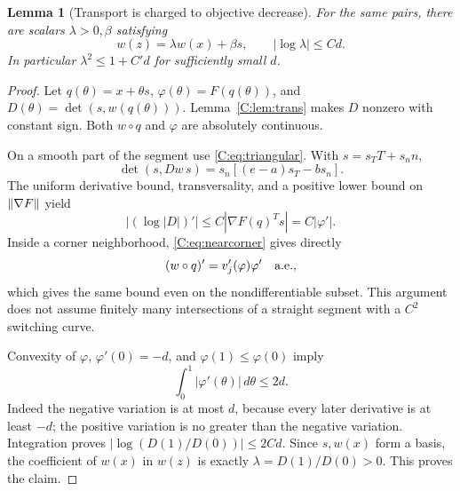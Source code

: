\documentclass[10pt,oneside,openany]{book}
\newtheorem{lemma}{Lemma}[chapter]
\theoremstyle{remark}\newtheorem{remark}{Remark}[chapter]
\begin{document}
\begin{lemma}[Transport is charged to objective decrease]\label{C:lem:transport}
For the same pairs, there are scalars $\lambda>0,\beta$ satisfying
\begin{equation}\label{C:eq:transport}
 w(z)=\lambda w(x)+\beta s,\qquad
 |\log\lambda|\le C d.
\end{equation}
In particular $\lambda^2\le1+C'd$ for sufficiently small $d$.
\end{lemma}
\begin{proof}
Let $q(\theta)=x+\theta s$, $\varphi(\theta)=F(q(\theta))$, and $D(\theta)=\det(s,w(q(\theta)))$. Lemma~\ref{C:lem:trans} makes $D$ nonzero with constant sign. Both $w\circ q$ and $\varphi$ are absolutely continuous.

On a smooth part of the segment use \eqref{C:eq:triangular}. With $s=s_TT+s_n n$,
\[
 \det(s,Dw\,s)=s_n[(e-a)s_T-bs_n].
\]
The uniform derivative bound, transversality, and a positive lower bound on $\left\lVert\nabla F\right\rVert$ yield
\[
 |(\log|D|)'|\le C|\nabla F(q)^Ts|=C|\varphi'|.
\]
Inside a corner neighborhood, \eqref{C:eq:nearcorner} gives directly
\[
 (w\circ q)'=v_j'(\varphi)\varphi'\quad\hbox{a.e.},
\]
which gives the same bound even on the nondifferentiable subset. This argument does not assume finitely many intersections of a straight segment with a $C^2$ switching curve.

Convexity of $\varphi$, $\varphi'(0)=-d$, and $\varphi(1)\le\varphi(0)$ imply
\begin{equation}\label{C:eq:variation}
 \int_0^1|\varphi'(\theta)|\,d\theta\le2d.
\end{equation}
Indeed the negative variation is at most $d$, because every later derivative is at least $-d$; the positive variation is no greater than the negative variation. Integration proves $|\log(D(1)/D(0))|\le2Cd$. Since $s,w(x)$ form a basis, the coefficient of $w(x)$ in $w(z)$ is exactly $\lambda=D(1)/D(0)>0$. This proves the claim.
\end{proof}
\end{document}
